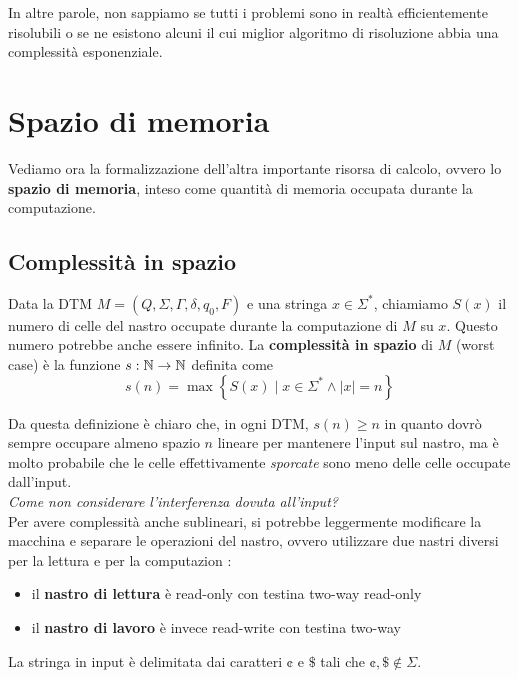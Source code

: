 In altre parole, non sappiamo se tutti i problemi sono in realtà efficientemente risolubili o se ne esistono alcuni il cui miglior algoritmo di risoluzione abbia una complessità esponenziale.\\

\section{Spazio di memoria}

Vediamo ora la formalizzazione dell'altra importante risorsa di calcolo, ovvero lo \textbf{spazio di memoria}, inteso come quantità di memoria occupata durante la computazione.\\

\subsection{Complessità in spazio}
Data la DTM $M = (Q, \Sigma, \Gamma, \delta, q_0, F)$ e una stringa $x \in \Sigma^\ast$, chiamiamo $S(x)$ il numero di celle del nastro occupate durante la computazione di $M$ su $x$. Questo numero potrebbe anche essere infinito. La \textbf{complessità in spazio} di $M$ (worst case) è la funzione $s: \mathbb{N} \rightarrow \mathbb{N}$ definita come
$$s(n) = \max \left\{S(x) \mid x \in \Sigma^\ast \wedge |x| = n \right\}$$

Da questa definizione è chiaro che, in ogni DTM, $s(n) \geq n$ in quanto dovrò sempre occupare almeno spazio $n$ lineare per mantenere l'input sul nastro, ma è molto probabile che le celle effettivamente \textit{sporcate} sono meno delle celle occupate dall'input.\\

\textit{Come non considerare l'interferenza dovuta all'input?}\\

Per avere complessità anche sublineari, si potrebbe leggermente modificare la macchina e separare le operazioni del nastro, ovvero utilizzare due nastri diversi per la lettura e per la computazion : 
\begin{itemize}
	\item il \textbf{nastro di lettura} è read-only con testina two-way read-only
	\item il \textbf{nastro di lavoro} è invece read-write con testina two-way
\end{itemize}

La stringa in input è delimitata dai caratteri $\cent$ e $\$$ tali che $\cent, \$ \notin \Sigma$.\\

